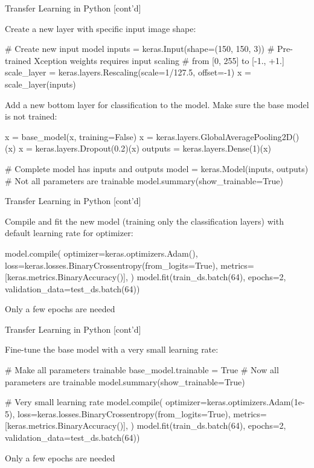 \documentclass[ignorenonframetext,xcolor=x11names]{beamer}
\begin{document}
\begin{frame}[fragile]{Transfer Learning in Python \small [cont'd]}

Create a new layer with specific input image shape:
\begin{pythoncode}
# Create new input model
inputs = keras.Input(shape=(150, 150, 3))
# Pre-trained Xception weights requires input scaling
# from [0, 255] to [-1., +1.]
scale_layer = keras.layers.Rescaling(scale=1/127.5, offset=-1)
x = scale_layer(inputs)
\end{pythoncode}

Add a new bottom layer for classification to the model. Make sure the base model is not trained:
\begin{pythoncode}
x = base_model(x, training=False)
x = keras.layers.GlobalAveragePooling2D()(x)
x = keras.layers.Dropout(0.2)(x)
outputs = keras.layers.Dense(1)(x)

# Complete model has inputs and outputs
model = keras.Model(inputs, outputs)
# Not all parameters are trainable
model.summary(show_trainable=True)
\end{pythoncode}
\end{frame}

\begin{frame}[fragile]{Transfer Learning in Python \small [cont'd]}

Compile and fit the new model (training only the classification layers) with default learning rate for optimizer:
\begin{pythoncode}
model.compile(
    optimizer=keras.optimizers.Adam(),
    loss=keras.losses.BinaryCrossentropy(from_logits=True),
    metrics=[keras.metrics.BinaryAccuracy()],
)
model.fit(train_ds.batch(64), epochs=2, 
          validation_data=test_ds.batch(64))
\end{pythoncode}
\begin{block}{}
Only a few epochs are needed
\end{block}

\end{frame}

\begin{frame}[fragile]{Transfer Learning in Python \small [cont'd]}

Fine-tune the base model with a very small learning rate:
\begin{pythoncode}
# Make all parameters trainable
base_model.trainable = True
# Now all parameters are trainable
model.summary(show_trainable=True)

# Very small learning rate
model.compile(
    optimizer=keras.optimizers.Adam(1e-5),
    loss=keras.losses.BinaryCrossentropy(from_logits=True),
    metrics=[keras.metrics.BinaryAccuracy()],
)
model.fit(train_ds.batch(64), epochs=2, 
          validation_data=test_ds.batch(64))
\end{pythoncode}

\begin{block}{}
Only a few epochs are needed
\end{block}
\end{frame}
\end{document}
